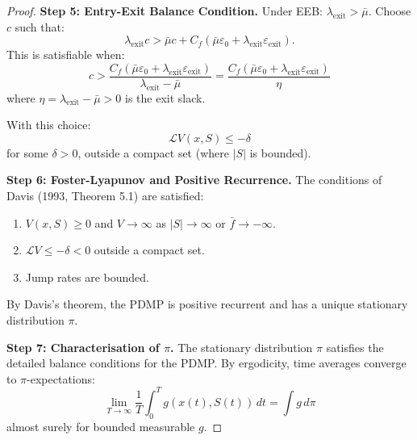\documentclass[12pt]{article}
\begin{document}
\begin{proof}
\textbf{Step 5: Entry-Exit Balance Condition.}
Under EEB: $\lambda_{\text{exit}} > \bar{\mu}$. Choose $c$ such that:
\[
\lambda_{\text{exit}} c > \bar{\mu} c + C_f(\bar{\mu} \varepsilon_0 + \lambda_{\text{exit}} \varepsilon_{\text{exit}}).
\]
This is satisfiable when:
\[
c > \frac{C_f(\bar{\mu} \varepsilon_0 + \lambda_{\text{exit}} \varepsilon_{\text{exit}})}{\lambda_{\text{exit}} - \bar{\mu}} = \frac{C_f(\bar{\mu} \varepsilon_0 + \lambda_{\text{exit}} \varepsilon_{\text{exit}})}{\eta}
\]
where $\eta = \lambda_{\text{exit}} - \bar{\mu} > 0$ is the exit slack.

With this choice:
\[
\mathcal{L} V(x, S) \leq -\delta
\]
for some $\delta > 0$, outside a compact set (where $|S|$ is bounded).

\textbf{Step 6: Foster-Lyapunov and Positive Recurrence.}
The conditions of Davis (1993, Theorem 5.1) are satisfied:
\begin{enumerate}
    \item $V(x, S) \geq 0$ and $V \to \infty$ as $|S| \to \infty$ or $\bar{f} \to -\infty$.
    \item $\mathcal{L} V \leq -\delta < 0$ outside a compact set.
    \item Jump rates are bounded.
\end{enumerate}
By Davis's theorem, the PDMP is positive recurrent and has a unique stationary distribution $\pi$.

\textbf{Step 7: Characterisation of $\pi$.}
The stationary distribution $\pi$ satisfies the detailed balance conditions for the PDMP. By ergodicity, time averages converge to $\pi$-expectations:
\[
\lim_{T \to \infty} \frac{1}{T} \int_0^T g(x(t), S(t)) \, dt = \int g \, d\pi
\]
almost surely for bounded measurable $g$.
\end{proof}
\end{document}
